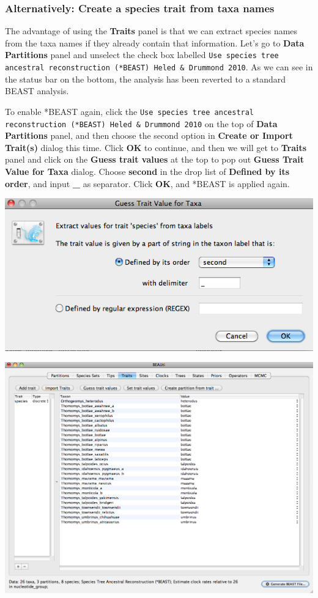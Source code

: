 \documentclass[12pt]{article}
\begin{document}
\medskip{}


\subsubsection*{Alternatively: Create a species trait from taxa names}

The advantage of using the {\bf Traits} panel is that we can extract species names from the taxa names if they already contain that information. Let's go to {\bf Data Partitions} panel and unselect the check box labelled \texttt{Use species tree ancestral reconstruction (*BEAST) Heled \& Drummond 2010}. As we can see in the status bar on the bottom, the analysis has been reverted to a standard BEAST analysis.

To enable *BEAST again, click the \texttt{Use species tree ancestral reconstruction (*BEAST) Heled \& Drummond 2010} on the top of {\bf Data Partitions} panel, and then choose the second option in {\bf Create or Import Trait(s)} dialog this time. Click \textbf{OK} to continue, and then we will get to {\bf Traits} panel and click on the \textbf{Guess trait values} at the top to pop out {\bf Guess Trait Value for Taxa} dialog. Choose \textbf{second} in the drop list of \textbf{Defined by its order}, and input \textbf{\_} as separator. Click \textbf{OK}, and *BEAST is applied again.

\medskip{}

\includegraphics[scale=0.4]{figures/BEAUti_GuessTrait}

\medskip{}

\medskip{}

\includegraphics[scale=0.4]{figures/BEAUti_Trait2}
\end{document}
